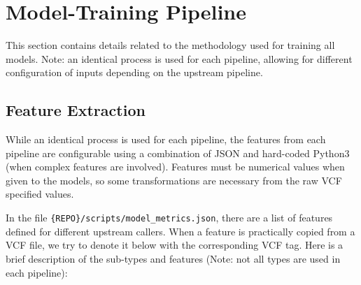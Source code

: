 \section{Model-Training Pipeline}
This section contains details related to the methodology used for training all models.  Note: an identical process is used for each pipeline, allowing for different configuration of inputs depending on the upstream pipeline.

\subsection{Feature Extraction}
While an identical process is used for each pipeline, the features from each pipeline are configurable using a combination of JSON and hard-coded Python3 (when complex features are involved).  Features must be numerical values when given to the models, so some transformations are necessary from the raw VCF specified values.

In the file \texttt{\{REPO\}/scripts/model\_metrics.json}, there are a list of features defined for different upstream callers. When a feature is practically copied from a VCF file, we try to denote it below with the corresponding VCF tag.  Here is a brief description of the sub-types and features (Note: not all types are used in each pipeline):

